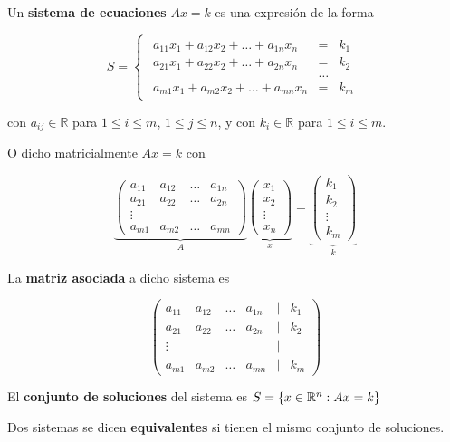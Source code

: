 \begin{definition} 
Un \textbf{sistema de ecuaciones} $Ax=k$ es una expresión de la forma

$$ S = \begin{cases}\begin{array}{lcl} 
a_{11} x_1 + a_{12} x_2 + \ldots + a_{1n} x_n & = & k_1 \\
a_{21} x_1 + a_{22} x_2 + \ldots + a_{2n} x_n & = & k_2 \\
& \ldots \\
a_{m1} x_1 + a_{m2} x_2 + \ldots + a_{mn} x_n & = & k_m
\end{array} \end{cases} $$

con $a_{ij} \in \mathbb{R}$ para $1 \leq i \leq m$, $1 \leq j \leq n$, y con $k_i \in \mathbb{R}$ para $1 \leq i \leq m$.

O dicho matricialmente $Ax = k$ con

$$ \underbrace{ \begin{pmatrix} 
a_{11} & a_{12} & \ldots & a_{1n} \\
a_{21} & a_{22} & \ldots & a_{2n} \\
\vdots & & & \\
a_{m1} & a_{m2} & \ldots & a_{mn} 
\end{pmatrix}}_A \underbrace{\begin{pmatrix} x_1 \\ x_2 \\ \vdots \\ x_n \end{pmatrix}}_x = \underbrace{ \begin{pmatrix} k_1 \\ k_2 \\ \vdots \\ k_m \end{pmatrix} }_k $$

La \textbf{matriz asociada} a dicho sistema es

$$ \begin{pmatrix} 
a_{11} & a_{12} & \ldots & a_{1n} & | & k_1 \\
a_{21} & a_{22} & \ldots & a_{2n} & | & k_2 \\
\vdots & & & & | & \\
a_{m1} & a_{m2} & \ldots & a_{mn} & | & k_m 
\end{pmatrix}$$

El \textbf{conjunto de soluciones} del sistema es $S = \{ x \in \mathbb{R}^n : Ax = k \}$

Dos sistemas se dicen \textbf{equivalentes} si tienen el mismo conjunto de soluciones.  

\end{definition}

